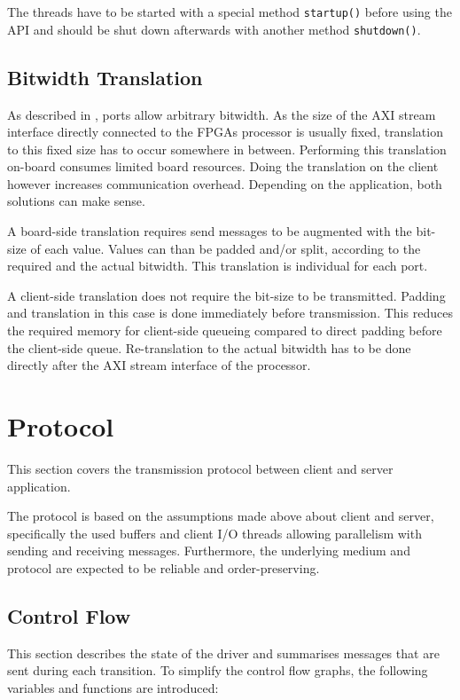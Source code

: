 \documentclass{report}
\begin{document}
The threads have to be started with a special method \texttt{startup()} before using the API and should be shut down afterwards with another method \texttt{shutdown()}.

\subsection{Bitwidth Translation}
\label{sec:arch:bitwidth}
As described in , ports allow arbitrary bitwidth. As the size of the AXI stream interface directly connected to the FPGAs processor is usually fixed, translation to this fixed size has to occur somewhere in between. Performing this translation on-board consumes limited board resources. Doing the translation on the client however increases communication overhead. Depending on the application, both solutions can make sense.

A board-side translation requires send messages to be augmented with the bit-size of each value. Values can than be padded and/or split, according to the required and the actual bitwidth. This translation is individual for each port.

A client-side translation does not require the bit-size to be transmitted. Padding and translation in this case is done immediately before transmission. This reduces the required memory for client-side queueing compared to direct padding before the client-side queue. Re-translation to the actual bitwidth has to be done directly after the AXI stream interface of the processor.

\section{Protocol}
\label{sec:protocol}
This section covers the transmission protocol between client and server application. 

The protocol is based on the assumptions made above about client and server, specifically the used buffers and client I/O threads allowing parallelism with sending and receiving messages. Furthermore, the underlying medium and protocol are expected to be reliable and order-preserving.

\subsection{Control Flow}
\label{sec:protocol:cfg}

This section describes the state of the driver and summarises messages that are sent during each transition. To simplify the control flow graphs, the following variables and functions are introduced:
\end{document}
